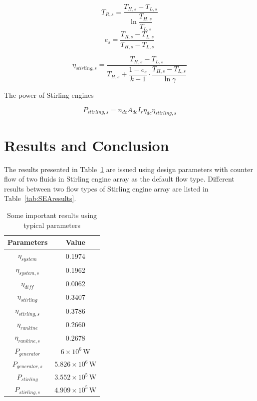 \documentclass{article}
\begin{document}
\begin{equation*}
	T_{R,s}=\dfrac{T_{H,s}-T_{L,s}}{\ln\dfrac{T_{H,s}}{T_{L,s}}}
\end{equation*}
\begin{equation*}
	e_{s}=\dfrac{T_{R,s}-T_{L,s}}{T_{H,s}-T_{L,s}}
\end{equation*}

\begin{equation*}
	\eta_{stirling,s}=\dfrac{T_{H,s}-T_{L,s}}{T_{H,s}+\dfrac{1-e_{s}}{k-1}\cdot\dfrac{T_{H,s}-T_{L,s}}{\ln\gamma}}
\end{equation*}

The power of Stirling engines

\begin{equation*}
	P_{stirling,s}=n_{dc}A_{dc}I_r\eta_{dc}\eta_{stirling,s}
\end{equation*}

\section{Results and Conclusion}

The results presented in Table~\ref{tab:importantResults} are issued using design parameters with counter flow of two fluids in Stirling engine array as the default flow type. Different results between two flow types of Stirling engine array are listed in Table~\ref{tab:SEAresults}.

\begin{table}[htbp]
	\caption{Some important results using typical parameters}
	\begin{center}
	\begin{tabular}{cc}
		\toprule
		Parameters	&	Value\\
		\midrule
		$\eta_{system}$		&	0.1974\\
		$\eta_{system,s}$	&	0.1962\\
		$\eta_{diff}$		&	0.0062\\
		$\eta_{stirling}$	&	0.3407\\
		$\eta_{stirling,s}$	&	0.3786\\
		$\eta_{rankine}$	&	0.2660\\
		$\eta_{rankine,s}$	&	0.2678\\
		$P_{generator}$		&	$6\times10^6\,$W\\
		$P_{generator,s}$	&	$5.826\times10^6\,$W\\
		$P_{stirling}$		&	$3.552\times10^5\,$W\\
		$P_{stirling,s}$	&	$4.909\times10^5\,$W\\
		\bottomrule
	\end{tabular}
	\end{center}
	\label{tab:importantResults}
\end{table}
\end{document}
